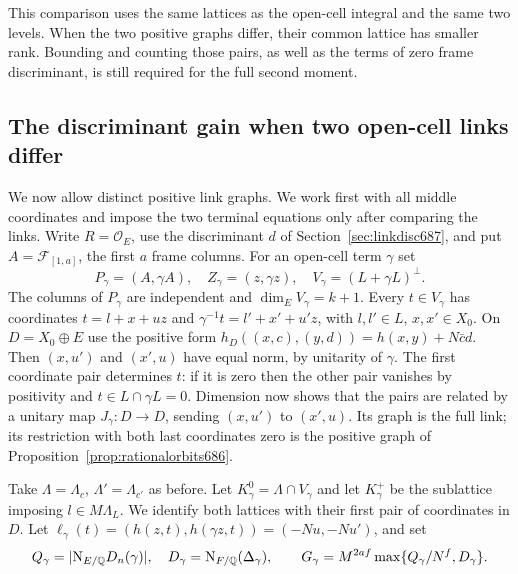 \documentclass[a4paper,11pt]{article}
\theoremstyle{definition}
\theoremstyle{remark}
\numberwithin{equation}{section}
\begin{document}
This comparison uses the same lattices as the open-cell
integral and the same two levels. When the two positive graphs
differ, their common lattice has smaller rank. Bounding and
counting those pairs, as well as the terms of zero frame
discriminant, is still required for the full second moment.


\subsection{The discriminant gain when two open-cell links differ}
\label{sec:differentlinks688}

We now allow distinct positive link graphs. We work first with all
middle coordinates and impose the two terminal equations only after
comparing the links. Write \(R=\mathcal O_E\), use the discriminant
\(d\) of Section~\ref{sec:linkdisc687}, and put \(A=\mathcal F_{[1,a]}\),
the first \(a\) frame columns. For an open-cell term \(\gamma\) set
\[
 P_\gamma=(A,\gamma A),\quad Z_\gamma=(z,\gamma z),\quad
 V_\gamma=(L+\gamma L)^\perp .
\]
The columns of \(P_\gamma\) are independent and
\(\dim_E V_\gamma=k+1\). Every \(t\in V_\gamma\) has coordinates
\(t=l+x+u z\) and \(\gamma^{-1}t=l'+x'+u'z\), with
\(l,l'\in L\), \(x,x'\in X_0\). On \(D=X_0\oplus E\) use the
positive form \(h_D((x,c),(y,d))=h(x,y)+N\bar c d\).
Then \((x,u')\) and \((x',u)\) have equal norm, by unitarity of
\(\gamma\). The first coordinate pair determines \(t\):
if it is zero then the other pair vanishes by positivity and
\(t\in L\cap\gamma L=0\). Dimension now shows that the pairs
are related by a unitary map
\(J_\gamma:D\longrightarrow D\), sending \((x,u')\) to \((x',u)\).
Its graph is the full link; its restriction with both last
coordinates zero is the positive graph of
Proposition~\ref{prop:rationalorbits686}.

Take \(\Lambda=\Lambda_c\), \(\Lambda'=\Lambda_{c'}\) as before.
Let \(K_\gamma^0=\Lambda\cap V_\gamma\) and let \(K_\gamma^+\)
be the sublattice imposing \(l\in M\Lambda_L\). We identify both
lattices with their first pair of coordinates in \(D\). Let
\(\ell_\gamma(t)=(h(z,t),h(\gamma z,t))=(-Nu,-Nu')\), and set
\[
 Q_\gamma=|{\rm N}_{E/\mathbb Q} D_n(\gamma)|,\quad
 D_\gamma={\rm N}_{F/\mathbb Q}(\Delta_\gamma),\qquad
 G_\gamma=M^{2af}\max\{Q_\gamma/N^f,D_\gamma\}.
\]
\end{document}
